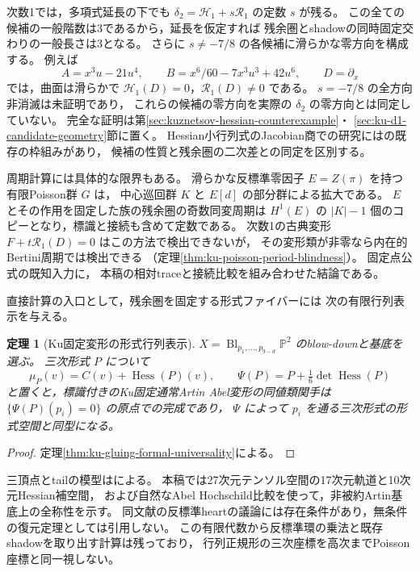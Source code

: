 \documentclass[a4paper,11pt]{ltjsarticle}
\numberwithin{equation}{section}
\theoremstyle{plain}
\newtheorem{theorem}{定理}[section]
\theoremstyle{definition}
\theoremstyle{remark}
\newcommand{\PP}{\mathbb P}
\begin{document}
次数1では，多項式延長の下でも
$\delta_2=\mathcal H_1+s\mathcal R_1$ の定数 $s$ が残る。
この全ての候補の一般階数は3であるから，延長を仮定すれば
残余圏とshadowの同時固定交わりの一般長さは3となる。
さらに $s\ne-7/8$ の各候補に滑らかな零方向を構成する。
例えば
\[
 A=x^3u-21u^4,\qquad B=x^6/60-7x^3u^3+42u^6,\qquad D=\partial_x
\]
では，曲面は滑らかで $\mathcal H_1(D)=0$，$\mathcal R_1(D)\ne0$ である。
$s=-7/8$ の全方向非消滅は未証明であり，
これらの候補の零方向を実際の $\delta_2$ の零方向とは同定していない。
完全な証明は第\ref{sec:kuznetsov-hessian-counterexample}・
\ref{sec:ku-d1-candidate-geometry}節に置く。
Hessian小行列式のJacobian商での研究には\cite{DimcaSticlaru2015}の既存の枠組みがあり，
候補の性質と残余圏の二次差との同定を区別する。

周期計算には具体的な限界もある。
滑らかな反標準零因子 $E=Z(\pi)$ を持つ有限Poisson群 $G$ は，
中心巡回群 $K$ と $E[d]$ の部分群による拡大である。
$E$ とその作用を固定した族の残余圏の奇数同変周期は
$H^1(E)$ の $|K|-1$ 個のコピーとなり，標識と接続も含めて定数である。
次数1の古典変形 $F+t\mathcal R_1(D)=0$ はこの方法で検出できないが，
その変形類が非零なら内在的Bertini周期では検出できる
（定理\ref{thm:ku-poisson-period-blindness}）。
固定点公式の既知入力\cite{Baranovsky2002,TabuadaVanDenBergh2018}に，
本稿の相対traceと接続比較を組み合わせた結論である。

直接計算の入口として，残余圏を固定する形式ファイバーには
次の有限行列表示を与える。
\begin{theorem}[Ku固定変形の形式行列表示]
\label{thm:main-ku-gluing-normal-form}
$X=\operatorname{Bl}_{p_1,\ldots,p_{9-d}}\PP^2$ のblow-downと基底を選ぶ。
三次形式 $P$ について
\[
 \mu_P(v)=C(v)+\operatorname{Hess}(P)(v),\qquad
 \Psi(P)=P+\tfrac16\det\operatorname{Hess}(P)
\]
と置くと，標識付きのKu固定通常Artin Abel変形の同値類関手は
$\{\Psi(P)(p_i)=0\}$ の原点での完成であり，
$\Psi$ によって $p_i$ を通る三次形式の形式空間と同型になる。
\end{theorem}
\begin{proof}
定理\ref{thm:ku-gluing-formal-universality}による。
\end{proof}
三頂点とtailの模型は\cite[Theorem~2.5, \S2.3]{AKO2006}による。
本稿では27次元テンソル空間の17次元軌道と10次元Hessian補空間，
および自然なAbel Hochschild比較を使って，非被約Artin基底上の全称性を示す。
同文献の反標準heartの議論には存在条件があり，無条件の復元定理としては引用しない。
この有限代数から反標準環の乗法と既存shadowを取り出す計算は残っており，
行列正規形の三次座標を高次までPoisson座標と同一視しない。
\end{document}
